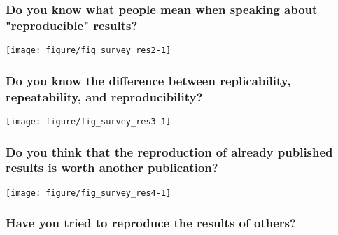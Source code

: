 \documentclass{article}\usepackage[]{graphicx}\usepackage[]{color}
\newenvironment{knitrout}{}{}
\begin{document}
\subsubsection{Do you know what people mean when speaking about "reproducible" results?}

\begin{knitrout}
\color{fgcolor}

{\centering \texttt{[image: figure/fig\_survey\_res2-1]} 

}



\end{knitrout}


\newpage



\subsubsection{Do you know the difference between replicability, repeatability, and reproducibility?}

\begin{knitrout}
\color{fgcolor}

{\centering \texttt{[image: figure/fig\_survey\_res3-1]} 

}



\end{knitrout}





\subsubsection{Do you think that the reproduction of already published results is worth another publication?}

\begin{knitrout}
\color{fgcolor}

{\centering \texttt{[image: figure/fig\_survey\_res4-1]} 

}



\end{knitrout}





\subsubsection{Have you tried to reproduce the results of others?}
\end{document}
